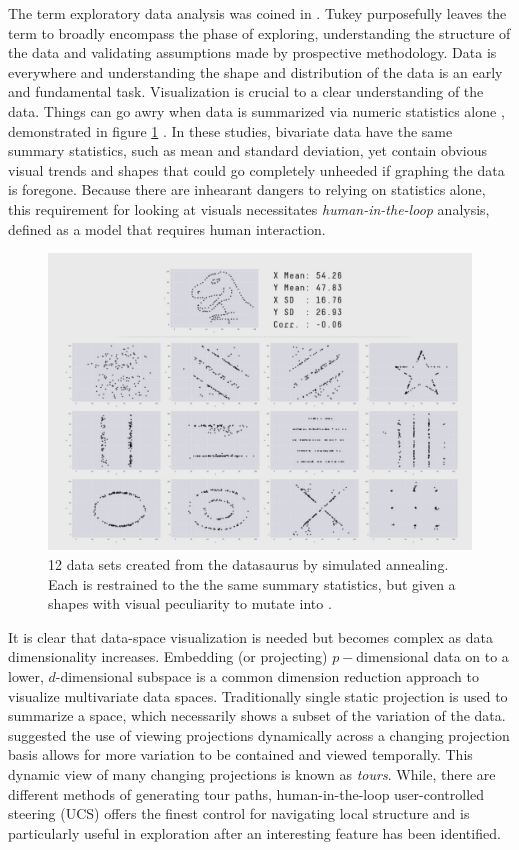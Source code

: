 \documentclass{monashthesis}
\begin{document}
The term exploratory data analysis was coined in
\textcite{tukey_exploratory_1977}. Tukey purposefully leaves the term to
broadly encompass the phase of exploring, understanding the structure of
the data and validating assumptions made by prospective methodology.
Data is everywhere and understanding the shape and distribution of the
data is an early and fundamental task. Visualization is crucial to a
clear understanding of the data. Things can go awry when data is
summarized via numeric statistics alone \autocite{anscombe_graphs_1973},
demonstrated in figure \ref{fig:matejka17fig}
\autocite{matejka_same_2017}. In these studies, bivariate data have the
same summary statistics, such as mean and standard deviation, yet
contain obvious visual trends and shapes that could go completely
unheeded if graphing the data is foregone. Because there are inhearant
dangers to relying on statistics alone, this requirement for looking at
visuals necessitates \emph{human-in-the-loop} analysis, defined as a
model that requires human interaction.






\begin{figure}

{\centering \includegraphics[width=0.7\linewidth]{./figures/matejka17fig} 

}

\caption{12 data sets created from the datasaurus by
simulated annealing. Each is restrained to the the same summary
statistics, but given a shapes with visual peculiarity to mutate into
\autocite{matejka_same_2017}.}\label{fig:matejka17fig}
\end{figure}

It is clear that data-space visualization is needed but becomes complex
as data dimensionality increases. Embedding (or projecting)
\(p-\)dimensional data on to a lower, \(d\)-dimensional subspace is a
common dimension reduction approach to visualize multivariate data
spaces. Traditionally single static projection is used to summarize a
space, which necessarily shows a subset of the variation of the data.
\textcite{asimov_grand_1985} suggested the use of viewing projections
dynamically across a changing projection basis allows for more variation
to be contained and viewed temporally. This dynamic view of many
changing projections is known as \emph{tours}. While, there are
different methods of generating tour paths, human-in-the-loop
user-controlled steering (UCS) offers the finest control for navigating
local structure and is particularly useful in exploration after an
interesting feature has been identified.
\end{document}
